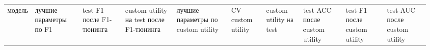 \documentclass[11pt]{article}
\newcounter{none}
\begin{document}
{\def\LTcaptype{none} %
\begin{longtable}[]{@{}
  >{\raggedright\arraybackslash}p{}
  >{\raggedright\arraybackslash}p{}
  >{\raggedleft\arraybackslash}p{}
  >{\raggedleft\arraybackslash}p{}
  >{\raggedright\arraybackslash}p{}
  >{\raggedleft\arraybackslash}p{}
  >{\raggedleft\arraybackslash}p{}
  >{\raggedleft\arraybackslash}p{}
  >{\raggedleft\arraybackslash}p{}
  >{\raggedleft\arraybackslash}p{}@{}}
\toprule\noalign{}
\begin{minipage}[b]{\linewidth}\raggedright
модель
\end{minipage} & \begin{minipage}[b]{\linewidth}\raggedright
лучшие параметры по F1
\end{minipage} & \begin{minipage}[b]{\linewidth}\raggedleft
test-F1 после F1-тюнинга
\end{minipage} & \begin{minipage}[b]{\linewidth}\raggedleft
custom utility на test после F1-тюнинга
\end{minipage} & \begin{minipage}[b]{\linewidth}\raggedright
лучшие параметры по custom utility
\end{minipage} & \begin{minipage}[b]{\linewidth}\raggedleft
CV custom utility
\end{minipage} & \begin{minipage}[b]{\linewidth}\raggedleft
custom utility на test
\end{minipage} & \begin{minipage}[b]{\linewidth}\raggedleft
test-ACC после custom utility
\end{minipage} & \begin{minipage}[b]{\linewidth}\raggedleft
test-F1 после custom utility
\end{minipage} & \begin{minipage}[b]{\linewidth}\raggedleft
test-AUC после custom utility
\end{minipage} \\

\end{longtable}}
\end{document}
